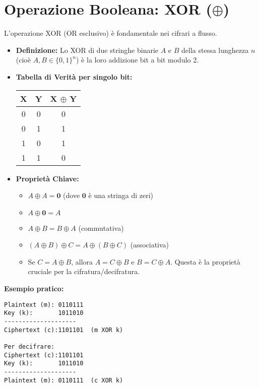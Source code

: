 \documentclass{article}
\begin{document}
\section{Operazione Booleana: XOR ($\oplus$)}
L'operazione XOR (OR esclusivo) è fondamentale nei cifrari a flusso.
\begin{itemize}
    \item \textbf{Definizione:} Lo XOR di due stringhe binarie $A$ e $B$ della stessa lunghezza $n$ (cioè $A, B \in \{0,1\}^n$) è la loro addizione bit a bit modulo 2.
    \item \textbf{Tabella di Verità per singolo bit:}
    \begin{center}
    \begin{tabular}{|c|c|c|}
        \hline
        \textbf{X} & \textbf{Y} & \textbf{X $\boldsymbol{\oplus}$ Y} \\
        \hline
        0 & 0 & 0 \\
        0 & 1 & 1 \\
        1 & 0 & 1 \\
        1 & 1 & 0 \\
        \hline
    \end{tabular}
    \end{center}
    \item \textbf{Proprietà Chiave:}
    \begin{itemize}
        \item $A \oplus A = \mathbf{0}$ (dove $\mathbf{0}$ è una stringa di zeri)
        \item $A \oplus \mathbf{0} = A$
        \item $A \oplus B = B \oplus A$ (commutativa)
        \item $(A \oplus B) \oplus C = A \oplus (B \oplus C)$ (associativa)
        \item Se $C = A \oplus B$, allora $A = C \oplus B$ e $B = C \oplus A$. Questa è la proprietà cruciale per la cifratura/decifratura.
    \end{itemize}
\end{itemize}
\textbf{Esempio pratico:}
\begin{verbatim}
Plaintext (m): 0110111
Key (k):       1011010
--------------------
Ciphertext (c):1101101  (m XOR k)

Per decifrare:
Ciphertext (c):1101101
Key (k):       1011010
--------------------
Plaintext (m): 0110111  (c XOR k)
\end{verbatim}
\end{document}

